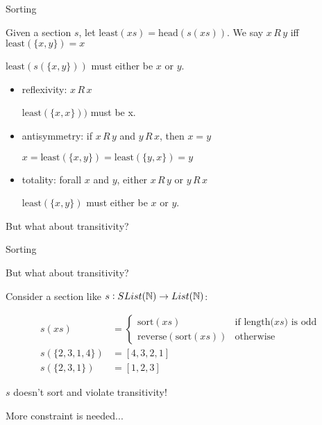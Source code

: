 \documentclass[9pt]{beamer}
\begin{document}
\begin{frame}{Sorting}

Given a section $s$, let $\text{least}(xs) = \text{head}(s(xs))$. We say $x \, R \, y$ iff $\text{least}(\{x, y\}) = x$

\begin{tblock}
    $\text{least}(s(\{x, y\}))$ must either be $x$ or $y$.
\end{tblock}

\begin{itemize}
    \item \alert{reflexivity}: $x \, R \, x$
    
    $\text{least}(\{x, x\}))$ must be x.
    
    \item \alert{antisymmetry}: if $x \, R \, y$ and $y \, R \, x$, then $x = y$
    
    $x = \text{least}(\{x, y\}) = \text{least}(\{y, x\}) = y$
    
    \item \alert{totality}: forall $x$ and $y$, either $x \, R \, y$ or $y \, R \, x$ 
    
    $\text{least}(\{x, y\})$ must either be $x$ or $y$.
    
\end{itemize}

But what about \alert{transitivity}?

\end{frame}

\begin{frame}{Sorting}

But what about \alert{transitivity}?

Consider a section like $s : SList(\mathbb{N}) \to List(\mathbb{N})$:

\begin{align*}
    s(xs) & = \begin{cases}
        \text{sort}(xs)                  & \text{if length($xs$) is odd}   \\
        \text{reverse}(\text{sort}(xs))  & \text{otherwise}
    \end{cases} \\
    s(\{2,3,1,4\}) & = [4,3,2,1] \\
    s(\{2,3,1\}) & = [1, 2, 3]
\end{align*}

$s$ doesn't sort and violate \alert{transitivity}!

More constraint is needed...
    
\end{frame}
\end{document}
